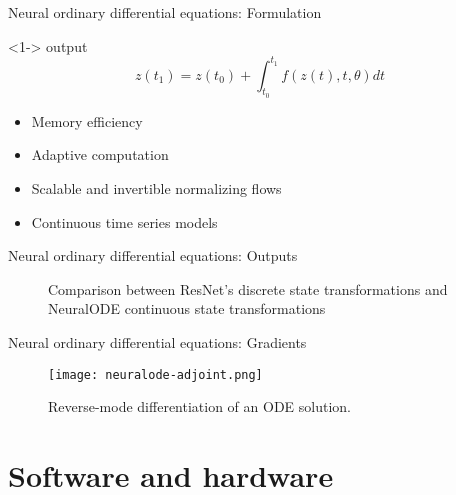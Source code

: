 \begin{frame}{Neural ordinary differential equations: Formulation}

    \begin{block}<1->{ output}
        \begin{equation*}
            z(t_1) = z(t_0) + \int_{t_0}^{t_1}{f(z(t), t, \theta)dt}
        \end{equation*}
    \end{block}

    \begin{itemize}
        \item<2-> Memory efficiency
        \item<3-> Adaptive computation
        \item<4-> Scalable and invertible normalizing flows
        \item<5-> Continuous time series models
    \end{itemize}
\end{frame}

\begin{frame}{Neural ordinary differential equations: Outputs}
    \begin{figure}[h]
        \centering
        \caption{Comparison between ResNet's discrete state transformations and \gls{NeuralODE} continuous state transformations}
        \label{fig:resnet-vs-odenet}
    \end{figure}
\end{frame}

\begin{frame}{Neural ordinary differential equations: Gradients}
    \begin{figure}[h]
        \centering
        \texttt{[image: neuralode-adjoint.png]}
        \caption{Reverse-mode differentiation of an \gls{ODE} solution. \cite{chenNeuralOrdinaryDifferential2019}}
        \label{fig:neuralode-adjoint}
    \end{figure}
\end{frame}

\section{Software and hardware}

